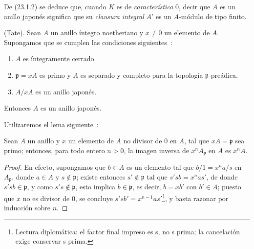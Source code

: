 De (23.1.2) se deduce que, cuando $K$ es de \emph{característica} $0$, decir que
$A$ es un anillo japonés significa que su \emph{clausura integral} $A'$ es
un $A$-módulo de tipo finito.

\begin{theorem}[23.1.3]
\label{0.23.1.3-es}
\textnormal{(Tate).} Sean $A$ un anillo íntegro noetheriano y $x\neq0$ un
elemento de $A$. Supongamos que se cumplen las condiciones siguientes~:
\begin{enumerate}
  \item[\textup{(i)}] $A$ es íntegramente cerrado.
  \item[\textup{(ii)}] $\mathfrak p=xA$ es primo y $A$ es separado y completo para
  la topología $\mathfrak p$-preádica.
  \item[\textup{(iii)}] $A/xA$ es un anillo japonés.
\end{enumerate}
Entonces $A$ es un anillo japonés.
\end{theorem}

Utilizaremos el lema siguiente~:

\begin{lemma}[23.1.3.1]
\label{0.23.1.3.1-es}
Sean $A$ un anillo y $x$ un elemento de $A$ no divisor de $0$ en $A$, tal
que $xA=\mathfrak p$ sea primo; entonces, para todo entero $n>0$, la imagen
inversa de $x^nA_{\mathfrak p}$ en $A$ es $x^nA$.
\end{lemma}

\begin{proof}
En efecto, supongamos que $b\in A$ es un elemento tal que
$b/1=x^na/s$ en $A_{\mathfrak p}$, donde $a\in A$ y
$s\notin\mathfrak p$; existe entonces $s'\notin\mathfrak p$ tal que
$s'sb=x^nas'$, de donde $s'sb\in\mathfrak p$, y como
$s's\notin\mathfrak p$, esto implica $b\in\mathfrak p$, es decir,
$b=xb'$ con $b'\in A$; puesto que $x$ no es divisor de $0$, se concluye
$s'sb'=x^{n-1}as'$\footnote{Lectura diplomática: el factor final impreso es s, no s prima; la cancelación exige conservar s prima.}, y basta razonar por inducción sobre $n$.
\end{proof}


